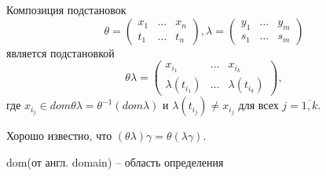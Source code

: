 Композиция подстановок
$$\theta = \begin{pmatrix} x_1 & \ldots & x_n \\     t_1 & \ldots & t_n \end{pmatrix},\lambda = \begin{pmatrix} y_1 & \ldots & y_m \\     s_1 & \ldots & s_m \end{pmatrix}$$
является подстановкой 
$$\theta\lambda = \begin{pmatrix} x_{i_1} & \ldots & x_{i_k} \\ \lambda(t_{i_1}) & \ldots & \lambda(t_{i_k}) \end{pmatrix},$$
где $x_{i_j}\in dom \theta\lambda=\theta^{-1}(dom \lambda)$ и $\lambda(t_{i_j})\neq x_{i_j}$ для всех $j=\overline{1,k}$.

Хорошо известно, что $(\theta\lambda)\gamma=\theta(\lambda\gamma)$.

dom(от англ. domain) -- область определения

